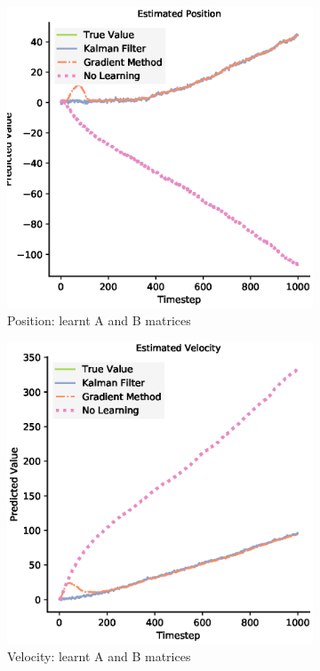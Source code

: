 \begin{figure}[H]
 \begin{subfigure}{0.32\textwidth}
 \centering
 \includegraphics[width=.8\linewidth]{chapter_3_figures/Estimated_Position_AB_matrix.eps}
 \caption{Position: learnt A and B matrices}
 \end{subfigure}
 \begin{subfigure}{0.32\textwidth}
 \centering
 \includegraphics[width=.8\linewidth]{chapter_3_figures/Estimated_Velocity_AB_matrix.eps}
 \caption{Velocity: learnt A and B matrices}
 \end{subfigure}
 \begin{subfigure}{0.32\textwidth}
 \centering

\end{subfigure}
\end{figure}
